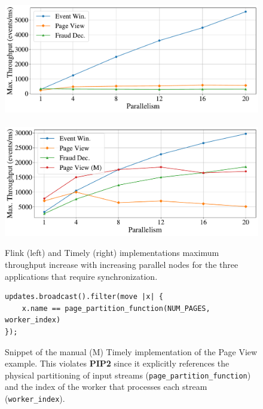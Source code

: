 \begin{figure}[t]
    \centering
    \includegraphics[width=0.48\columnwidth]{figures/dgs/flink_max_throughput_scaleup}
    ~
	  \includegraphics[width=0.48\columnwidth]{figures/dgs/timely_max_throughput_scaleup}
    \caption{
    Flink (left) and Timely (right) implementations maximum throughput increase with increasing parallel nodes for the three applications that require synchronization.
    }
    \label{fig:existing-implementations-scaling}
\end{figure}


\begin{figure}[t]
  \centering
  \footnotesize{}
\begin{verbatim}
updates.broadcast().filter(move |x| {
    x.name == page_partition_function(NUM_PAGES, worker_index)
});
\end{verbatim}
\caption{Snippet of the manual (M) Timely implementation of the Page View example.
This violates \textbf{PIP2} since it explicitly references the physical partitioning of input streams
(\texttt{page\_partition\_function}) and the index of the worker that processes each stream (\texttt{worker\_index}).
}
\label{fig:timely-snippet}
\end{figure}


